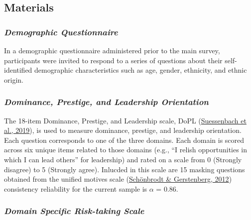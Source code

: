 \documentclass[
  donotrepeattitle,doc, 12pt, a4paper,floatsintext]{apa7}
\begin{document}
\hypertarget{materials-1}{%
\subsection{Materials}\label{materials-1}}

\hypertarget{demographic-questionnaire-2}{%
\subsubsection{\texorpdfstring{\emph{Demographic Questionnaire}}{Demographic Questionnaire}}\label{demographic-questionnaire-2}}

In a demographic questionnaire administered prior to the main survey, participants were invited to respond to a series of questions about their self-identified demographic characteristics such as age, gender, ethnicity, and ethnic origin.

\hypertarget{dominance-prestige-and-leadership-orientation-2}{%
\subsubsection{\texorpdfstring{\emph{Dominance, Prestige, and Leadership Orientation}}{Dominance, Prestige, and Leadership Orientation}}\label{dominance-prestige-and-leadership-orientation-2}}

The 18-item Dominance, Prestige, and Leadership scale, DoPL (\protect\hyperlink{ref-suessenbach2019}{Suessenbach et al., 2019}), is used to measure dominance, prestige, and leadership orientation. Each question corresponds to one of the three domains. Each domain is scored across six unique items related to those domains (e.g., ``I relish opportunities in which I can lead others'' for leadership) and rated on a scale from 0 (Strongly disagree) to 5 (Strongly agree). Inlucded in this scale are 15 masking questions obtained from the unified motives scale (\protect\hyperlink{ref-schonbrodt2012}{Schönbrodt \& Gerstenberg, 2012}) consistency reliability for the current sample is \(\alpha\) = 0.86.

\hypertarget{domain-specific-risk-taking-scale}{%
\subsubsection{\texorpdfstring{\emph{Domain Specific Risk-taking Scale}}{Domain Specific Risk-taking Scale}}\label{domain-specific-risk-taking-scale}}
\end{document}
